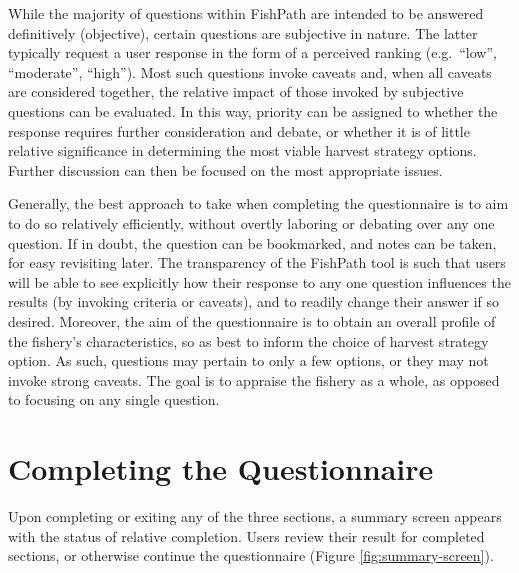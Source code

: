 \documentclass[
  11pt,
]{book}
\begin{document}
While the majority of questions within FishPath are intended to be answered definitively (objective), certain questions are subjective in nature. The latter typically request a user response in the form of a perceived ranking (e.g.~``low'', ``moderate'', ``high''). Most such questions invoke caveats and, when all caveats are considered together, the relative impact of those invoked by subjective questions can be evaluated. In this way, priority can be assigned to whether the response requires further consideration and debate, or whether it is of little relative significance in determining the most viable harvest strategy options. Further discussion can then be focused on the most appropriate issues.

Generally, the best approach to take when completing the questionnaire is to aim to do so relatively efficiently, without overtly laboring or debating over any one question. If in doubt, the question can be bookmarked, and notes can be taken, for easy revisiting later. The transparency of the FishPath tool is such that users will be able to see explicitly how their response to any one question influences the results (by invoking criteria or caveats), and to readily change their answer if so desired. Moreover, the aim of the questionnaire is to obtain an overall profile of the fishery's characteristics, so as best to inform the choice of harvest strategy option. As such, questions may pertain to only a few options, or they may not invoke strong caveats. The goal is to appraise the fishery as a whole, as opposed to focusing on any single question.

\hypertarget{completing-the-questionnaire}{%
\section{Completing the Questionnaire}\label{completing-the-questionnaire}}

Upon completing or exiting any of the three sections, a summary screen appears with the status of relative completion. Users review their result for completed sections, or otherwise continue the questionnaire (Figure \ref{fig:summary-screen}).
\end{document}
